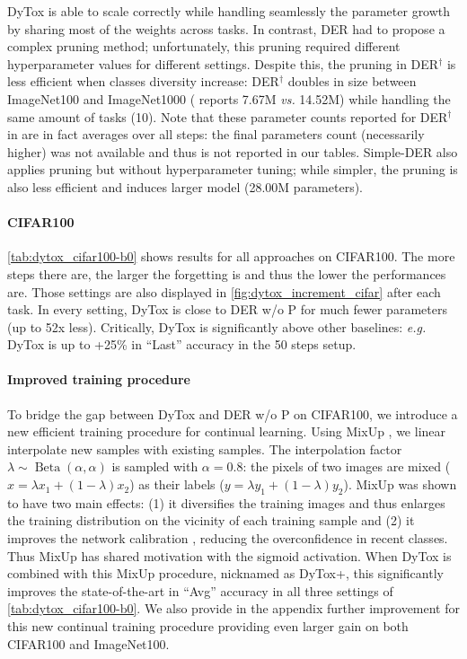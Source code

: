 DyTox is able to scale correctly while handling seamlessly the parameter growth by sharing most of
the weights across tasks. In contrast, DER had to propose a complex pruning method; unfortunately,
this pruning required different hyperparameter values for different settings. Despite this, the
pruning in DER$^\dagger$ is less efficient when classes diversity increase: DER$^\dagger$ doubles in
size between ImageNet100 and ImageNet1000 (\citep{yan2021der} reports 7.67M \textit{vs.} 14.52M)
while handling the same amount of tasks (10). Note that these parameter counts reported for
DER$^\dagger$ in \citep{yan2021der} are in fact averages over all steps: the final parameters count
(necessarily higher) was not available and thus is not reported in our tables. Simple-DER also
applies pruning but without hyperparameter tuning; while simpler, the pruning is also less efficient
and induces larger model (28.00M parameters).

\vspace{-0.5em}
\paragraph{CIFAR100} \autoref{tab:dytox_cifar100-b0} shows results for all approaches on CIFAR100. The
more steps there are, the larger the forgetting is and thus the lower the performances are. Those
settings are also displayed in \autoref{fig:dytox_increment_cifar} after each task. In every setting,
DyTox is close to DER w/o P  for much fewer parameters (up to 52x less). Critically, DyTox is
significantly above other baselines: \textit{e.g.} DyTox is up to +25\% in ``Last'' accuracy in the
50 steps setup.

\vspace{-1em}
\paragraph{Improved training procedure} To bridge the gap between DyTox and DER w/o P on CIFAR100,
we introduce a new efficient training procedure for continual learning. Using MixUp
\citep{hingyi2018mixup}, we linear interpolate new samples with existing samples. The interpolation
factor $\lambda \sim \operatorname{Beta}(\alpha, \alpha)$ is sampled with $\alpha=0.8$: the pixels
of two images are mixed ($x = \lambda x_1 + (1 - \lambda) x_2$) as their labels ($y = \lambda y_1 +
    (1 - \lambda) y_2$). MixUp was shown to have two main effects: (1) it diversifies the training
images and thus enlarges the training distribution on the vicinity of each training sample
\citep{chapelle2001vicinalrisk} and (2) it improves the network calibration
\citep{guo2017miscalibration,thulasidasan2019mixupcalibration}, reducing the overconfidence in recent
classes. Thus MixUp has shared motivation with the sigmoid activation. When DyTox is combined with
this MixUp procedure, nicknamed as DyTox+, this significantly improves the state-of-the-art in
``Avg'' accuracy in all three settings of \autoref{tab:dytox_cifar100-b0}. We also provide in the appendix
further improvement for this new continual training procedure providing even larger gain on both
CIFAR100 and ImageNet100.

